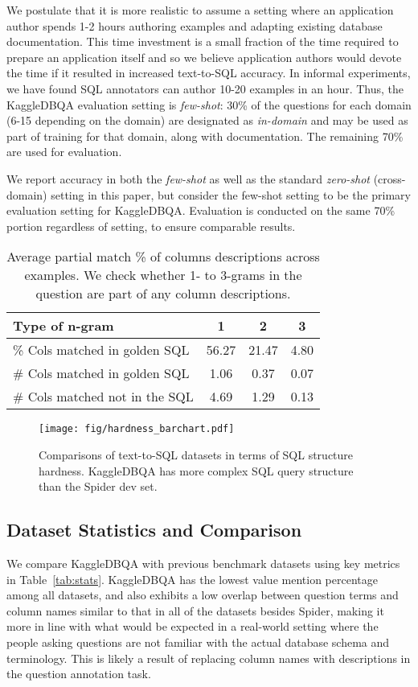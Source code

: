 \documentclass[11pt,a4paper]{article}
\newcommand{\systemname}{\mbox{KaggleDBQA}\xspace}
\begin{document}
We postulate that it is more realistic to assume a setting where an application author spends 1-2 hours authoring
examples and adapting existing database documentation.
This time investment is a small fraction of the time required to prepare an application itself and so we believe
application authors would devote the time if it resulted in increased text-to-SQL accuracy.
In informal experiments, we have found SQL annotators can author 10-20 examples in an hour.
Thus, the \systemname evaluation setting is \textit{few-shot}: 30\% of the questions for each domain (6-15 depending
on the domain) are designated as \textit{in-domain} and may be used as part of training for that domain,
along with documentation.
The remaining 70\% are used for evaluation.

We report accuracy in both the \textit{few-shot} as well as the standard \textit{zero-shot} (cross-domain) setting in
this paper, but consider the few-shot setting to be the primary evaluation setting for \systemname.
Evaluation is conducted on the same 70\% portion regardless of setting, to ensure comparable results.

\begin{table}[t]
    \small
    \centering
    \caption{Average partial match \% of columns descriptions across examples. We check whether 1- to 3-grams in the question are part of any column descriptions.}
    \label{tab:description}
    \begin{tabular}{lccc}
    \toprule
        Type of n-gram  &  1 & 2 & 3 \\
        \midrule
        \% Cols matched in golden SQL  & 56.27 & 21.47 & 4.80  \\
         \# Cols matched in golden SQL  & 1.06 & 0.37 & 0.07  \\
        \# Cols matched not in the SQL & 4.69 & 1.29 & 0.13 \\
        \bottomrule
    \end{tabular}
\end{table}

\begin{figure}[t]
    \centering
    \texttt{[image: fig/hardness\_barchart.pdf]}
    \caption{Comparisons of text-to-SQL datasets in terms of SQL structure hardness.
    \systemname has more complex SQL query structure than the Spider dev set.}
    \label{fig:hardness}
\end{figure}


\subsection{Dataset Statistics and Comparison}
We compare \systemname with previous benchmark datasets using key metrics in Table~\ref{tab:stats}.
\systemname has the lowest value mention percentage among all datasets, and also exhibits a low overlap between question
terms and column names similar to that in all of the datasets besides Spider, making it more in line with what would be
expected in a real-world setting where the people asking questions are not familiar with the actual database schema and
terminology. This is likely a result of replacing column names with descriptions in the question annotation task.
\end{document}
